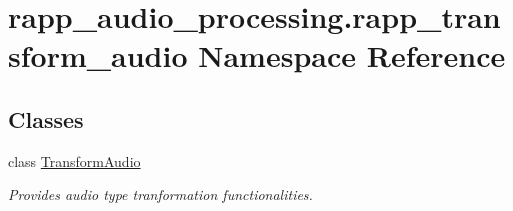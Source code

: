 \hypertarget{namespacerapp__audio__processing_1_1rapp__transform__audio}{\section{rapp\-\_\-audio\-\_\-processing.\-rapp\-\_\-transform\-\_\-audio Namespace Reference}
\label{namespacerapp__audio__processing_1_1rapp__transform__audio}
}
\subsection*{Classes}
\begin{DoxyCompactItemize}
\item 
class \hyperlink{classrapp__audio__processing_1_1rapp__transform__audio_1_1TransformAudio}{Transform\-Audio}
\begin{DoxyCompactList}\small\item\em Provides audio type tranformation functionalities. \end{DoxyCompactList}\end{DoxyCompactItemize}
